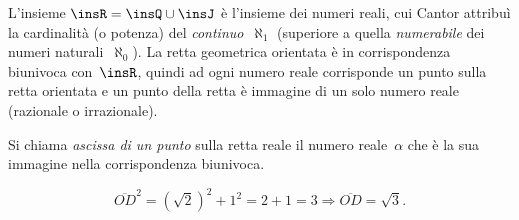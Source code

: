 L'insieme $\insR = \insQ \cup \insJ$ è l'insieme dei numeri reali, cui
Cantor attribuì la cardinalità (o potenza) del \emph{continuo}~$\aleph_1$ (superiore a quella \emph{numerabile} dei numeri naturali~$\aleph_0$).
La retta geometrica orientata è in corrispondenza biunivoca con~$\insR$,
quindi ad ogni numero reale corrisponde un punto sulla retta orientata e un punto della retta è immagine
di un solo numero reale (razionale o irrazionale).

\begin{definizione}
Si chiama \emph{ascissa di un punto} sulla retta reale il numero reale~$\alpha$ che è la sua immagine nella corrispondenza biunivoca.
\end{definizione}


% 
% 


\[\overline{OD}^{2}=(\sqrt{2})^{2}+1^{2}=2+1=3\Rightarrow\overline{OD}=\sqrt{3}.\]
% 

